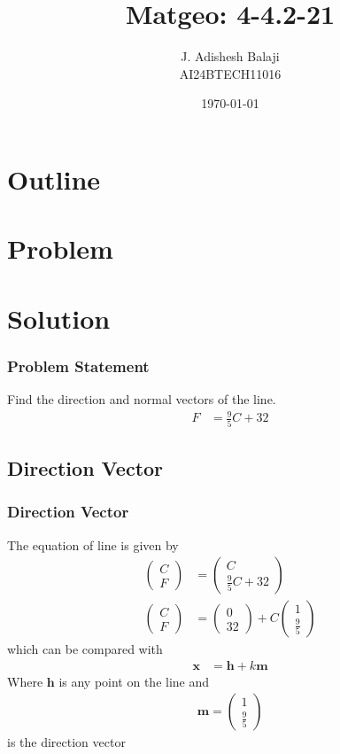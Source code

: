 \documentclass{beamer}
\title{Matgeo: 4-4.2-21}
\author{J. Adishesh Balaji \\ AI24BTECH11016}
\date{\today}
\theoremstyle{remark}
\newcommand{\myvec}[1]{\ensuremath{\begin{pmatrix}#1\end{pmatrix}}}
\let\vec\mathbf
\numberwithin{equation}{section}
\begin{document}
\begin{frame}
\titlepage
\end{frame}

\section*{Outline}
\begin{frame}
\tableofcontents
\end{frame}
\section{Problem}
\section{Solution}
\begin{frame}
\frametitle{Problem Statement}
%
Find the direction and normal vectors of the line.
\begin{align}
\label{eq:Line equation}
F &= \frac{9}{5} C + 32
\end{align}
\end{frame}


\subsection{Direction Vector}
\begin{frame}
\frametitle{Direction Vector}
The equation of line is given by \\
\begin{align*}
\myvec{C \\ F} &= \myvec{C \\ \frac{9}{5}C+32} \\
\myvec{C \\ F}	&= \myvec{0 \\ 32} + C\myvec{1 \\ \frac{9}{5}}
\end{align*}
which can be compared with \\
        \begin{align}
            \vec{x} &= \vec{h} + k\vec{m}
        \end{align}
Where $\vec{h}$ is any point on the line and \\
        \begin{align}
        \label{eq:directionvec}
            \vec{m} = \myvec{1 \\ \frac{9}{5}}
        \end{align}
is the direction vector
\end{frame}
\end{document}
